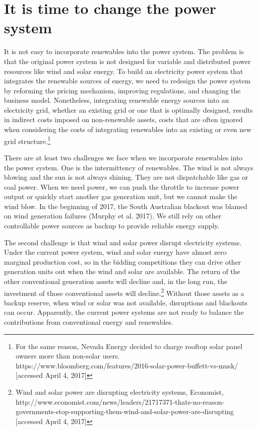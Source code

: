 \section{It is time to change the power
	system}\label{it-is-time-to-change-the-power-system}

It is not easy to incorporate renewables into the power system. The
problem is that the original power system is not designed for variable
and distributed power resources like wind and solar energy. To build an
electricity power system that integrates the renewable sources of
energy, we need to redesign the power system by reforming the pricing
mechanism, improving regulations, and changing the business model.
Nonetheless, integrating renewable energy sources into an electricity
grid, whether an existing grid or one that is optimally designed,
results in indirect costs imposed on non-renewable assets, costs that
are often ignored when considering the costs of integrating renewables
into an existing or even new grid structure.\footnote{For the same
	reason, Nevada Energy decided to charge rooftop solar panel owners
	more than non-solar users.
	https://www.bloomberg.com/features/2016-solar-power-buffett-vs-musk/
	{[}accessed April 4, 2017{]}}

There are at least two challenges we face when we incorporate renewables
into the power system. One is the intermittency of renewables. The wind
is not always blowing and the sun is not always shining. They are not
dispatchable like gas or coal power. When we need power, we can push the
throttle to increase power output or quickly start another gas
generation unit, but we cannot make the wind blow. In the beginning of
2017, the South Australian blackout was blamed on wind generation
failures (Murphy et al. 2017). We still rely on other controllable power
sources as backup to provide reliable energy supply.

The second challenge is that wind and solar power disrupt electricity
systems. Under the current power system, wind and solar energy have
almost zero marginal production cost, so in the bidding competitions
they can drive other generation units out when the wind and solar are
available. The return of the other conventional generation assets will
decline and, in the long run, the investment of those conventional
assets will decline.\footnote{Wind and solar power are disrupting
	electricity systems, Economist,
	http://www.economist.com/news/leaders/21717371-thats-no-reason-governments-stop-supporting-them-wind-and-solar-power-are-disrupting
	{[}accessed April 4, 2017{]}} Without those assets as a backup
reserve, when wind or solar was not available, disruptions and blackouts
can occur. Apparently, the current power systems are not ready to
balance the contributions from conventional energy and renewables.

